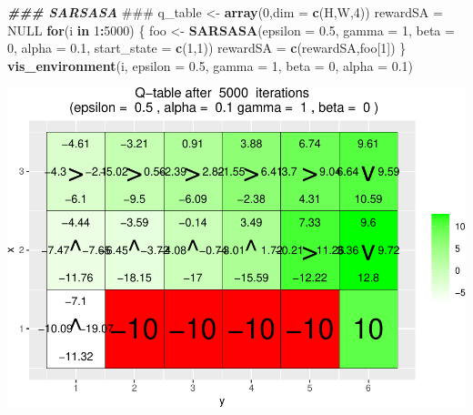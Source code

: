 \documentclass[
]{article}
\newenvironment{Shaded}{\begin{snugshade}}{\end{snugshade}}
\newcommand{\AlertTok}[1]{\textcolor[rgb]{0.94,0.16,0.16}{#1}}
\newcommand{\AttributeTok}[1]{\textcolor[rgb]{0.13,0.29,0.53}{#1}}
\newcommand{\ConstantTok}[1]{\textcolor[rgb]{0.56,0.35,0.01}{#1}}
\newcommand{\ControlFlowTok}[1]{\textcolor[rgb]{0.13,0.29,0.53}{\textbf{#1}}}
\newcommand{\DecValTok}[1]{\textcolor[rgb]{0.00,0.00,0.81}{#1}}
\newcommand{\DocumentationTok}[1]{\textcolor[rgb]{0.56,0.35,0.01}{\textbf{\textit{#1}}}}
\newcommand{\FloatTok}[1]{\textcolor[rgb]{0.00,0.00,0.81}{#1}}
\newcommand{\FunctionTok}[1]{\textcolor[rgb]{0.13,0.29,0.53}{\textbf{#1}}}
\newcommand{\NormalTok}[1]{#1}
\newcommand{\OtherTok}[1]{\textcolor[rgb]{0.56,0.35,0.01}{#1}}
\newcommand{\SpecialCharTok}[1]{\textcolor[rgb]{0.81,0.36,0.00}{\textbf{#1}}}
\begin{document}
\begin{Shaded}
\begin{Highlighting}[]
\DocumentationTok{\#\#\# SARSASA }\AlertTok{\#\#\#}
\NormalTok{q\_table }\OtherTok{\textless{}{-}} \FunctionTok{array}\NormalTok{(}\DecValTok{0}\NormalTok{,}\AttributeTok{dim =} \FunctionTok{c}\NormalTok{(H,W,}\DecValTok{4}\NormalTok{))}
\NormalTok{rewardSA }\OtherTok{=} \ConstantTok{NULL}
\ControlFlowTok{for}\NormalTok{(i }\ControlFlowTok{in} \DecValTok{1}\SpecialCharTok{:}\DecValTok{5000}\NormalTok{) \{}
\NormalTok{  foo }\OtherTok{\textless{}{-}} \FunctionTok{SARSASA}\NormalTok{(}\AttributeTok{epsilon =} \FloatTok{0.5}\NormalTok{, }\AttributeTok{gamma =} \DecValTok{1}\NormalTok{, }\AttributeTok{beta =} \DecValTok{0}\NormalTok{, }\AttributeTok{alpha =} \FloatTok{0.1}\NormalTok{, }\AttributeTok{start\_state =} \FunctionTok{c}\NormalTok{(}\DecValTok{1}\NormalTok{,}\DecValTok{1}\NormalTok{))}
\NormalTok{  rewardSA }\OtherTok{=} \FunctionTok{c}\NormalTok{(rewardSA,foo[}\DecValTok{1}\NormalTok{])}
\NormalTok{\}}
\FunctionTok{vis\_environment}\NormalTok{(i, }\AttributeTok{epsilon =} \FloatTok{0.5}\NormalTok{, }\AttributeTok{gamma =} \DecValTok{1}\NormalTok{, }\AttributeTok{beta =} \DecValTok{0}\NormalTok{, }\AttributeTok{alpha =} \FloatTok{0.1}\NormalTok{)}
\end{Highlighting}
\end{Shaded}

\includegraphics{jan2021_files/figure-latex/unnamed-chunk-3-3.pdf}
\end{document}
